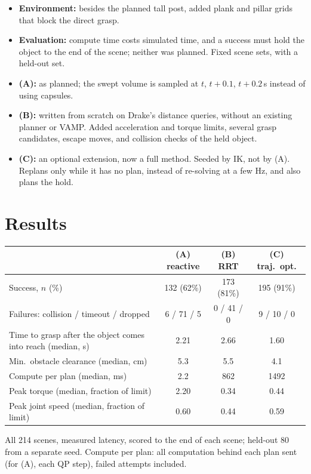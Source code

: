 \documentclass[11pt]{article}
\begin{document}
\begin{itemize}
  \item \textbf{Environment:} besides the planned tall post, added plank and pillar grids that block the
    direct grasp.
  \item \textbf{Evaluation:} compute time costs simulated time, and a success must hold the object to
    the end of the scene; neither was planned. Fixed scene sets, with a held-out set.
  \item \textbf{(A):} as planned; the swept volume is sampled at $t$, $t+0.1$, $t+0.2$\,s instead of
    using capsules.
  \item \textbf{(B):} written from scratch on Drake's distance queries, without an existing planner or
    VAMP. Added acceleration and torque limits, several grasp candidates, escape moves, and collision
    checks of the held object.
  \item \textbf{(C):} an optional extension, now a full method. Seeded by IK, not by (A). Replans only
    while it has no plan, instead of re-solving at a few Hz, and also plans the hold.
\end{itemize}

\section{Results}

\begin{center}
\begin{tabular}{@{}lccc@{}}
  \toprule
  & (A) reactive & (B) RRT & (C) traj.\ opt. \\
  \midrule
  Success, $n$ (\%)                                           & 132 (62\%) & 173 (81\%) & 195 (91\%) \\
  Failures: collision / timeout / dropped                     & 6 / 71 / 5 & 0 / 41 / 0 & 9 / 10 / 0 \\
  Time to grasp after the object comes into reach (median, s) & 2.21       & 2.66       & 1.60 \\
  Min.\ obstacle clearance (median, cm)                       & 5.3        & 5.5        & 4.1 \\
  Compute per plan (median, ms)                               & 2.2        & 862        & 1492 \\
  Peak torque (median, fraction of limit)                     & 2.20       & 0.34       & 0.44 \\
  Peak joint speed (median, fraction of limit)                & 0.60       & 0.44       & 0.59 \\
  \bottomrule
\end{tabular}

\smallskip
{\small All 214 scenes, measured latency, scored to the end of each scene; held-out 80 from a separate seed.
Compute per plan: all computation behind each plan sent (for (A), each QP step), failed attempts included.}
\end{center}
\end{document}
